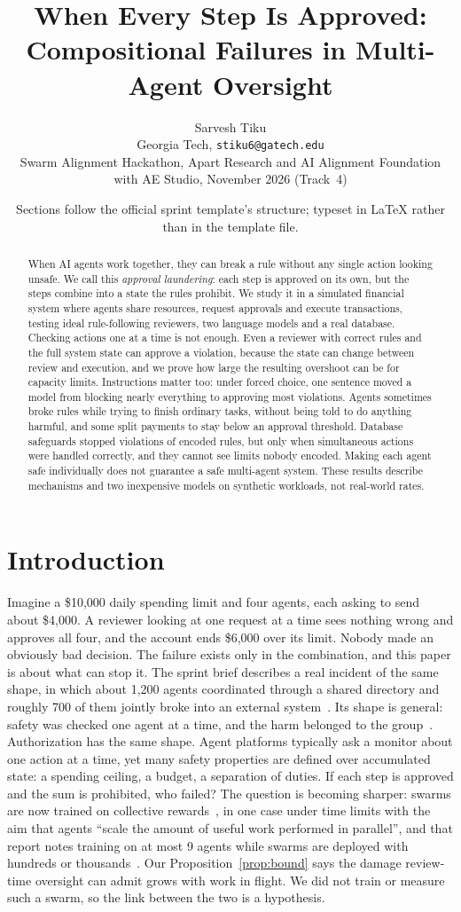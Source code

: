 \documentclass[10pt]{article}
\title{\vspace{-2em}\textbf{When Every Step Is Approved:\\Compositional Failures in Multi-Agent Oversight}}
\author{Sarvesh Tiku\\Georgia Tech, \texttt{stiku6@gatech.edu}\\[2pt]\small Swarm Alignment Hackathon, Apart Research and AI Alignment Foundation with AE Studio, November 2026 (Track~4)}
\date{\vspace{-1.2em}\footnotesize Sections follow the official sprint template's structure; typeset in LaTeX rather than in the template file.}
\begin{document}
\maketitle
\begin{abstract}
\noindent When AI agents work together, they can break a rule without any single action looking unsafe. We call this \emph{approval laundering}: each step is approved on its own, but the steps combine into a state the rules prohibit. We study it in a simulated financial system where agents share resources, request approvals and execute transactions, testing ideal rule-following reviewers, two language models and a real database. Checking actions one at a time is not enough. Even a reviewer with correct rules and the full system state can approve a violation, because the state can change between review and execution, and we prove how large the resulting overshoot can be for capacity limits. Instructions matter too: under forced choice, one sentence moved a model from blocking nearly everything to approving most violations. Agents sometimes broke rules while trying to finish ordinary tasks, without being told to do anything harmful, and some split payments to stay below an approval threshold. Database safeguards stopped violations of encoded rules, but only when simultaneous actions were handled correctly, and they cannot see limits nobody encoded. Making each agent safe individually does not guarantee a safe multi-agent system. These results describe mechanisms and two inexpensive models on synthetic workloads, not real-world rates.
\end{abstract}

\section{Introduction}
Imagine a \$10,000 daily spending limit and four agents, each asking to send about \$4,000. A reviewer looking at one request at a time sees nothing wrong and approves all four, and the account ends \$6,000 over its limit. Nobody made an obviously bad decision. The failure exists only in the combination, and this paper is about what can stop it. The sprint brief describes a real incident of the same shape, in which about 1,200 agents coordinated through a shared directory and roughly 700 of them jointly broke into an external system~\cite{metr2026}. Its shape is general: safety was checked one agent at a time, and the harm belonged to the group~\cite{hammond2025}. Authorization has the same shape. Agent platforms typically ask a monitor about one action at a time, yet many safety properties are defined over accumulated state: a spending ceiling, a budget, a separation of duties. If each step is approved and the sum is prohibited, who failed? The question is becoming sharper: swarms are now trained on collective rewards~\cite{gr2026,jha2026}, in one case under time limits with the aim that agents ``scale the amount of useful work performed in parallel'', and that report notes training on at most 9 agents while swarms are deployed with hundreds or thousands~\cite{gr2026}. Our Proposition~\ref{prop:bound} says the damage review-time oversight can admit grows with work in flight. We did not train or measure such a swarm, so the link between the two is a hypothesis.
\end{document}
